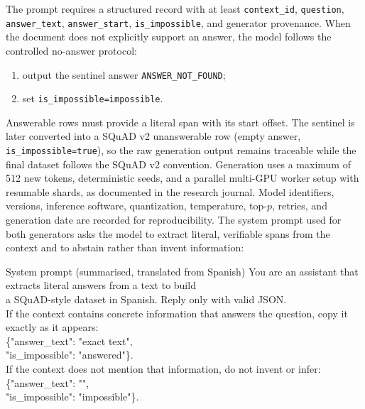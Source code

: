 \documentclass[graybox]{SNmult}
\begin{document}
The prompt requires a structured record with at least \texttt{context\_id},
\texttt{question}, \texttt{answer\_text}, \texttt{answer\_start},
\texttt{is\_impossible}, and generator provenance. When the document does not
explicitly support an answer, the model follows the controlled no-answer
protocol:
\begin{enumerate}
\item output the sentinel answer \texttt{ANSWER\_NOT\_FOUND};
\item set \texttt{is\_impossible=impossible}.
\end{enumerate}
Answerable rows must provide a literal span with its start offset. The
sentinel is later converted into a SQuAD v2 unanswerable row (empty answer,
\texttt{is\_impossible=true}), so the raw generation output remains traceable
while the final dataset follows the SQuAD v2 convention. Generation uses a
maximum of 512 new tokens, deterministic seeds, and a parallel multi-GPU
worker setup with resumable shards, as documented in the research
journal. Model identifiers, versions, inference software, quantization,
temperature, top-$p$, retries, and generation date are recorded for
reproducibility. The system prompt used for both generators asks the model to
extract literal, verifiable spans from the context and to abstain rather than
invent information:

\begin{programcode}{System prompt (summarised, translated from Spanish)}
You are an assistant that extracts literal answers from a text to build\\
a SQuAD-style dataset in Spanish. Reply only with valid JSON.\\
If the context contains concrete information that answers the question, copy it\\
exactly as it appears:\\
\{"answer\_text": "exact text",\\
 "is\_impossible": "answered"\}.\\
If the context does not mention that information, do not invent or infer:\\
\{"answer\_text": "",\\
 "is\_impossible": "impossible"\}.\\
\end{programcode}
\end{document}
